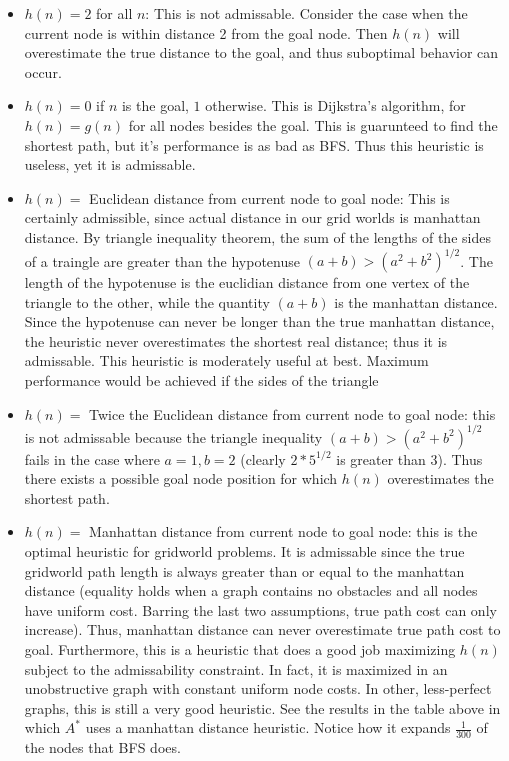 \documentclass[12pt]{article}
\newenvironment{questionList}{
\newcounter{ctr}
\begin{list}{\textbf{Question \arabic{ctr}.} \\ \\ }
  {\usecounter{ctr}}
  }{
\end{list}
}
\begin{document}
\begin{questionList}
\begin{itemize}
  \item $h(n)= 2$ for all $n$: This is not admissable. Consider the case when the current node is within distance 2 from the goal node. Then $h(n)$ will overestimate the true distance to the goal, and thus suboptimal behavior can occur. 
  \item $h(n)= 0$ if $n$ is the goal, $1$ otherwise. This is Dijkstra's algorithm, for $h(n) = g(n)$ for all nodes besides the goal. This is guarunteed to find the shortest path, but it's performance is as bad as BFS. Thus this heuristic is useless, yet it is admissable.  
  \item $h(n)= $ Euclidean distance from current node to goal node: This is certainly admissible, since actual distance in our grid worlds is manhattan distance. By triangle inequality theorem, the sum of the lengths of the sides of a traingle are greater than the hypotenuse $(a + b) > (a^2 + b^2)^{1/2}$. The length of the hypotenuse is the euclidian distance from one vertex of the triangle to the other, while the quantity $(a + b)$ is the manhattan distance. Since the hypotenuse can never be longer than the true manhattan distance, the heuristic never overestimates the shortest real distance; thus it is admissable. This heuristic is moderately useful at best. Maximum performance would be achieved if the sides of the triangle
  \item $h(n)= $ Twice the Euclidean distance from current node to goal node: this is not admissable because the triangle inequality $(a + b) > (a^2 + b^2)^{1/2}$ fails in the case where $a = 1, b = 2$ (clearly $2*5^{1/2}$ is greater than 3). Thus there exists a possible goal node position for which $h(n)$ overestimates the shortest path. 
  \item $h(n)= $ Manhattan distance from current node to goal node: this is the optimal heuristic for gridworld problems. It is admissable since the true gridworld path length is always greater than or equal to the manhattan distance (equality holds when a graph contains no obstacles and all nodes have uniform cost. Barring the last two assumptions, true path cost can only increase). Thus, manhattan distance can never overestimate true path cost to goal. Furthermore, this is a heuristic that does a good job maximizing $h(n)$ subject to the admissability constraint. In fact, it is maximized in an unobstructive graph with constant uniform node costs. In other, less-perfect graphs, this is still a very good heuristic. See the results in the table above in which $A^*$ uses a manhattan distance heuristic. Notice how it expands $\frac{1}{300}$ of the nodes that BFS does. 

\end{itemize}
\end{questionList}
\end{document}
